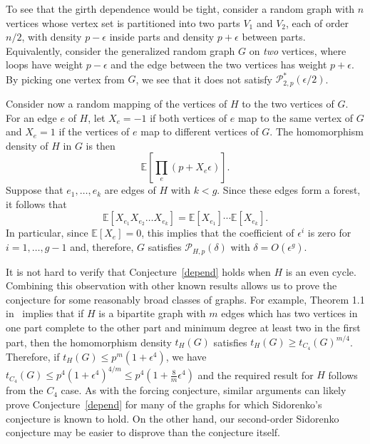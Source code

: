 \documentclass[11pt]{article}
\begin{document}
To see that the girth dependence would be tight, consider a random graph with $n$ vertices whose vertex set is partitioned into two parts $V_1$ and $V_2$, each of order $n/2$, with density $p-\epsilon$ inside parts and density $p+\epsilon$ between parts. Equivalently, consider the generalized random graph $G$ on {\it two} vertices, where loops have weight $p-\epsilon$ and the edge between the two vertices has weight $p+\epsilon$. By picking one vertex from $G$, we see that it does not satisfy $\mathcal{P}_{2,p}^*(\epsilon/2)$.

Consider now a random mapping of the vertices of $H$ to the two vertices of $G$. For an edge $e$ of $H$, let $X_e=-1$ if both vertices of $e$ map to the same vertex of $G$ and $X_e=1$ if the vertices of $e$ map to different vertices of $G$. The homomorphism density of $H$ in $G$ is then
$$\mathbb{E}[\prod_{e}(p+X_e\epsilon)].$$
Suppose that $e_1,\ldots,e_k$ are edges of $H$ with $k < g$. Since these edges form a forest, it follows that
$$\mathbb{E}[X_{e_1}X_{e_2}\ldots X_{e_k}]=\mathbb{E}[X_{e_1}]\cdots\mathbb{E}[X_{e_k}].$$ 
In particular, since $\mathbb{E}[X_{e}]=0$,
this implies that the coefficient of $\epsilon^i$ is zero for $i=1,\ldots,g-1$ and, therefore, $G$ satisfies $\mathcal{P}_{H,p}(\delta)$ with $\delta = O(\epsilon^g)$.

It is not hard to verify that Conjecture~\ref{depend} holds when $H$ is an even cycle. Combining this observation with other known results allows us to prove the conjecture for some reasonably broad classes of graphs. For example, Theorem 1.1 in~\cite{CFS10} implies that if $H$ is a bipartite graph with $m$ edges which has two vertices in one part complete to the other part and minimum degree at least two in the first part, then the homomorphism density $t_H(G)$ satisfies $t_H(G) \geq t_{C_4}(G)^{m/4}$. Therefore, if $t_H(G) \leq p^m(1+ \epsilon^4)$, we have $t_{C_4}(G) \leq p^4 (1+ \epsilon^4)^{4/m} \leq p^4 (1 + \frac{8}{m} \epsilon^4)$ and the required result for $H$ follows from the $C_4$ case. As with the forcing conjecture, similar arguments can likely prove Conjecture~\ref{depend} for many of the graphs for which Sidorenko's conjecture is known to hold. On the other hand, our second-order Sidorenko conjecture may be easier to disprove than the conjecture itself.
\end{document}
